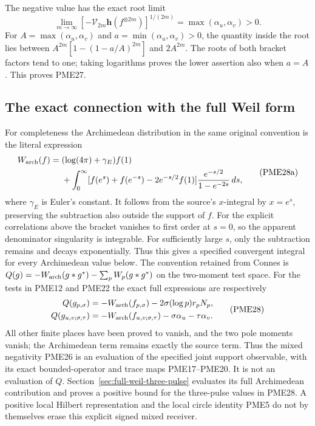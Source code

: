 \documentclass[11pt]{article}
\begin{document}
The negative value has the exact root limit
\[
 \lim_{m\to\infty}
 [-\mathcal V_{2m}\mathbf h(f^{\otimes 2m})]^{1/(2m)}
 =\max(\alpha_u,\alpha_v)>0.
 \tag{PME27}
\]
For $A=\max(\alpha_u,\alpha_v)$ and
$a=\min(\alpha_u,\alpha_v)>0$, the quantity inside the root lies
between $A^{2m}[1-(1-a/A)^{2m}]$ and $2A^{2m}$.
The roots of both bracket factors tend to one; taking logarithms
proves the lower assertion also when $a=A$. This proves PME27.

\subsection{The exact connection with the full Weil form}

For completeness the Archimedean distribution in the same original
convention is the literal expression
\[
\begin{split}
 W_{\rm arch}(f)={}&(\log(4\pi)+\gamma_E)f(1)\\
 &+\int_0^\infty
 [f(e^s)+f(e^{-s})-2e^{-s/2}f(1)]
 \frac{e^{-s/2}}{1-e^{-2s}}\,ds,
\end{split}
\tag{PME28a}
\]
where $\gamma_E$ is Euler's constant. It follows from the source's
$x$-integral by $x=e^s$, preserving the subtraction also outside
the support of $f$. For the explicit correlations above the bracket
vanishes to first order at $s=0$, so the apparent denominator
singularity is integrable. For sufficiently large $s$, only the
subtraction remains and decays exponentially. Thus this gives a
specified convergent integral for every Archimedean value below.
The convention retained from Connes is
$Q(g)=-W_{\rm arch}(g*g^*)-\sum_pW_p(g*g^*)$ on the two-moment
test space. For the tests in PME12 and PME22 the exact full expressions
are respectively
\[
\begin{split}
 Q(g_{p,\sigma})
   &=-W_{\rm arch}(f_{p,\sigma})
                         -2\sigma(\log p)r_pN_p,\\
 Q(g_{u,v;\sigma,\tau})
   &=-W_{\rm arch}(f_{u,v;\sigma,\tau})
                         -\sigma\alpha_u-\tau\alpha_v.
\end{split}
\tag{PME28}
\]
All other finite places have been proved to vanish, and the two pole
moments vanish; the Archimedean term remains exactly the source term.
Thus the mixed negativity PME26 is an evaluation of the specified
joint support observable, with its exact bounded-operator and trace
maps PME17--PME20. It is not an evaluation of $Q$.
Section~\ref{sec:full-weil-three-pulse} evaluates its full Archimedean
contribution and proves a positive bound for the three-pulse values
in PME28. A positive local Hilbert representation and
the local circle identity PME5 do not by themselves erase this
explicit signed mixed receiver.
\end{document}
